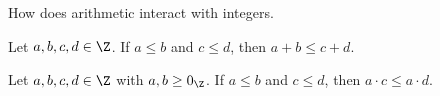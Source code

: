 

How does arithmetic interact with integers.


\begin{proposition}
  Let $a, b, c, d \in \Z$.
  If $a \leq b$ and $c \leq d$, then $a + b \leq c + d$.
\end{proposition}

\begin{proposition}
  Let $a, b, c, d \in \Z$ with $a, b \geq 0_{\Z}$.
  If $a \leq b$ and $c \leq d$, then $a \cdot c \leq a \cdot d$.
\end{proposition}

\blankpage
